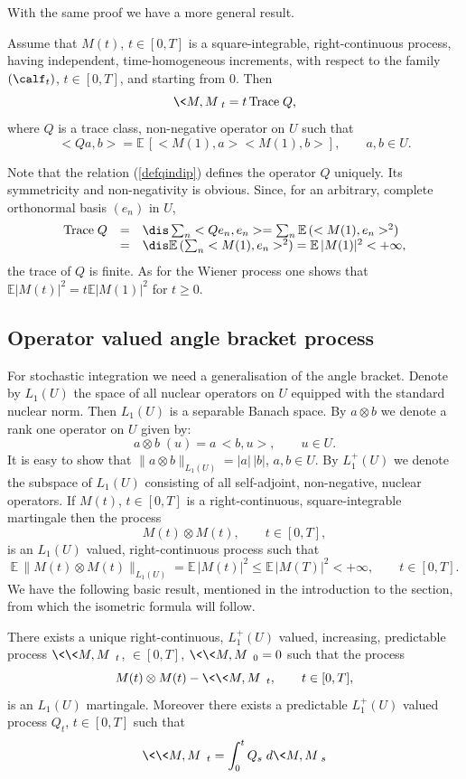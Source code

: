 \documentclass[preprint]{imsart}
\def\E{\mathbb E}
\begin{document}
{With the same proof we have a more general result.

\begin{Proposition}
Assume that $M(t)$, $t\in [0,T]$ is a square-integrable,
right-continuous process, having independent, time-homogeneous
increments, with respect to the family $(\calf_t)$, $t\in [0,T]$,
and starting from $0$. Then
  $$
  \<M,M\>_t=t\, {\rm Trace  \;} Q,
  $$
where $Q$ is a trace class, non-negative operator on $U$ such that
\begin{equation}\label{defqindip}
  <Qa,b>=\E\, [<M(1),a> <M(1),b>],\qquad a,b\in U.
\end{equation}
\end{Proposition}

Note that the relation (\ref{defqindip}) defines the operator $Q$
uniquely. Its symmetricity and non-negativity is obvious. Since,
for an arbitrary, complete orthonormal basis $(e_n)$ in $U$,
$$
\begin{array}{lll}
  {\rm Trace \;} Q & = &
  \dis \sum_n <Qe_n,e_n>=\sum_n \E\, (<M(1),e_n>^2)  \\
    & = & \dis \E\, (\sum_n  <M(1),e_n>^2)=
    \E\,|M(1)|^2<+\infty,
\end{array}
$$
the trace of $Q$ is finite.
As for the Wiener process one shows that
$\E |M(t)|^2=t \E |M(1)|^2$ for $t\ge 0$.


\subsection{Operator valued angle bracket process}
For stochastic integration we need a generalisation of the angle
bracket. Denote by $L_1(U)$ the space of all nuclear operators on
$U$ equipped with the standard nuclear norm. Then $L_1(U)$ is a
separable Banach space. By $a\otimes b$ we denote a rank one
operator on $U$ given by:
$$
a\otimes b\; (u)=a\, <b,u>,\qquad u\in U.
$$
It is easy to show that $\|a\otimes b\|_{L_1(U)}=|a|\, |b|$,
$a,b\in U$.
By $L_1^+(U)$ we denote the subspace of $L_1(U)$ consisting of all
self-adjoint, non-negative, nuclear operators.
If $M(t)$, $t\in [0,T]$ is a right-continuous,
square-integrable martingale then the process
$$
M(t)\otimes M(t),\qquad t\in [0,T],
$$
is an $L_1(U)$ valued, right-continuous process such that
$$
\E\, \|M(t)\otimes M(t)\|_{L_1(U)}=
\E\, |M(t)|^2\leq \E\, |M(T)|^2<+\infty,
\qquad t\in [0,T].
$$
We have the following basic result, mentioned in the introduction to the section, from which the
isometric formula will follow.
\begin{Theorem}\label{MAIN}
  There exists a unique right-continuous, $L_1^+(U)$ valued,
  increasing, predictable process $\<\<M,M\>\>_t$, $\in [0,T]$,
  $\<\<M,M\>\>_0=0$ such that the process
  $$
  M(t)\otimes M(t)-\<\<M,M\>\>_t,\qquad t\in [0,T],
  $$
  is an $L_1(U)$ martingale. Moreover there exists a predictable
  $L_1^+(U)$ valued process $Q_t$, $t\in [0,T]$ such that
\begin{equation}\label{defqtdim}
  \<\<M,M\>\>_t=\int_0^tQ_s\; d\<M,M\>_s
\end{equation}
\end{Theorem}

}
\end{document}
